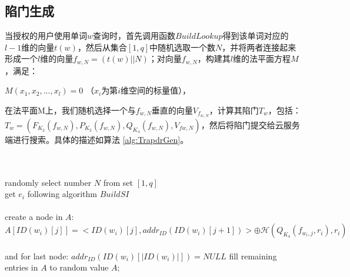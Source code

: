\subsection{陷门生成}
\label{sec:searchpattern_trapdoor_generator}

当授权的用户使用单词$w$查询时，首先调用函数$BuildLookup$得到该单词对应的$l-1$维的向量$t(w)$，然后从集合$[1,q]$中随机选取一个数$N$，并将两者连接起来形成一个$l$维的向量$f_{w,N} = (t(w)||N)$；对向量$f_{w,N}$，构建其$l$维的法平面方程$M$ \cite{schwarzenberger1961vector}，满足：
\begin{center}
$M(x_1, x_2, ..., x_l) = 0$ （$x_i$为第$i$维空间的标量值），
\end{center}
在法平面M上，我们随机选择一个与$f_{w,N}$垂直的向量$V_{f_{w,N}}$，计算其陷门$T_w$，包括：$T_w = (F_{K_2}(f_{w,N}), P_{K_3}(f_{w,N}), Q_{K_4}(f_{w,N}), V_{f{w,N}} )$，然后将陷门提交给云服务端进行搜索。具体的描述如算法 \ref{alg:TrapdrGen}。

\begin{algorithm}[!htb]
\caption{$T_w \leftarrow TrapdrGen(w,K)$}
\label{alg:TrapdrGen}
\begin{algorithmic} [1]

\ENSURE ~~\\
   ~~\\
  \STATE randomly select number $N$ from set $[1,q]$ ~~\\
         get $e_i$ following algorithm $BuildSI$ ~~\\

          ~~\\
             \STATE create a node in $A$:
                    $A[ID(w_i)[j]] = <ID(w_i)[j], addr_{ID}(ID(w_i)[j+1])> \oplus \mathcal{H}(Q_{K_4}(f_{w_i,j},r_i), r_i)$ ~~\\
                    and for last node: $addr_{ID}(ID(w_i)[|ID(w_i)|]) = NULL$
           \ENDFOR
         \ENDFOR
         \STATE fill remaining entries in $A$ to random value
  \RETURN ${A}$;
\end{algorithmic}
\end{algorithm}



